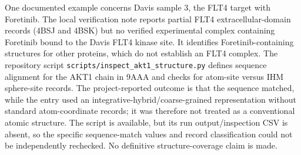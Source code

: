 One documented example concerns Davis sample 3, the FLT4 target with Foretinib. The local verification note reports partial FLT4 extracellular-domain records (4BSJ and 4BSK) but no verified experimental complex containing Foretinib bound to the Davis FLT4 kinase site. It identifies Foretinib-containing structures for other proteins, which do not establish an FLT4 complex. The repository script \texttt{scripts/inspect\_akt1\_structure.py} defines sequence alignment for the AKT1 chain in 9AAA and checks for atom-site versus IHM sphere-site records. The project-reported outcome is that the sequence matched, while the entry used an integrative-hybrid/coarse-grained representation without standard atom-coordinate records; it was therefore not treated as a conventional atomic structure. The script is available, but its run output/inspection CSV is absent, so the specific sequence-match values and record classification could not be independently rechecked. No definitive structure-coverage claim is made.

